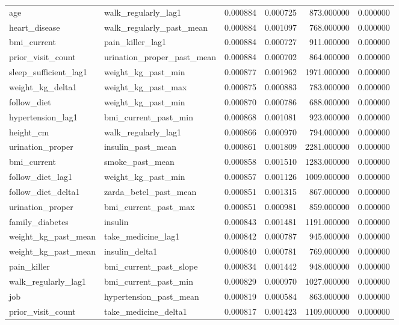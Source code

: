 \begin{longtable}{llrrrr}
age & walk\_regularly\_lag1 & 0.000884 & 0.000725 & 873.000000 & 0.000000 \\
heart\_disease & walk\_regularly\_past\_mean & 0.000884 & 0.001097 & 768.000000 & 0.000000 \\
bmi\_current & pain\_killer\_lag1 & 0.000884 & 0.000727 & 911.000000 & 0.000000 \\
prior\_visit\_count & urination\_proper\_past\_mean & 0.000884 & 0.000702 & 864.000000 & 0.000000 \\
sleep\_sufficient\_lag1 & weight\_kg\_past\_min & 0.000877 & 0.001962 & 1971.000000 & 0.000000 \\
weight\_kg\_delta1 & weight\_kg\_past\_max & 0.000875 & 0.000883 & 783.000000 & 0.000000 \\
follow\_diet & weight\_kg\_past\_min & 0.000870 & 0.000786 & 688.000000 & 0.000000 \\
hypertension\_lag1 & bmi\_current\_past\_min & 0.000868 & 0.001081 & 923.000000 & 0.000000 \\
height\_cm & walk\_regularly\_lag1 & 0.000866 & 0.000970 & 794.000000 & 0.000000 \\
urination\_proper & insulin\_past\_mean & 0.000861 & 0.001809 & 2281.000000 & 0.000000 \\
bmi\_current & smoke\_past\_mean & 0.000858 & 0.001510 & 1283.000000 & 0.000000 \\
follow\_diet\_lag1 & weight\_kg\_past\_min & 0.000857 & 0.001126 & 1009.000000 & 0.000000 \\
follow\_diet\_delta1 & zarda\_betel\_past\_mean & 0.000851 & 0.001315 & 867.000000 & 0.000000 \\
urination\_proper & bmi\_current\_past\_max & 0.000851 & 0.000981 & 859.000000 & 0.000000 \\
family\_diabetes & insulin & 0.000843 & 0.001481 & 1191.000000 & 0.000000 \\
weight\_kg\_past\_mean & take\_medicine\_lag1 & 0.000842 & 0.000787 & 945.000000 & 0.000000 \\
weight\_kg\_past\_mean & insulin\_delta1 & 0.000840 & 0.000781 & 769.000000 & 0.000000 \\
pain\_killer & bmi\_current\_past\_slope & 0.000834 & 0.001442 & 948.000000 & 0.000000 \\
walk\_regularly\_lag1 & bmi\_current\_past\_min & 0.000829 & 0.000970 & 1027.000000 & 0.000000 \\
job & hypertension\_past\_mean & 0.000819 & 0.000584 & 863.000000 & 0.000000 \\
prior\_visit\_count & take\_medicine\_delta1 & 0.000817 & 0.001423 & 1109.000000 & 0.000000 \\

\end{longtable}
